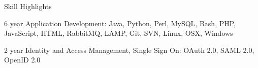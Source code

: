 \documentclass{resume} %
\begin{document}


\begin{rSection}{Skill Highlights}

\begin{rSubsection}{6 year Application Development: Java, Python, Perl, MySQL, Bash, PHP, JavaScript, HTML, RabbitMQ, LAMP, Git, SVN, Linux, OSX, Windows}{}{}

\end{rSubsection}

\begin{rSubsection}{2 year Identity and Access Management, Single Sign On: OAuth 2.0, SAML 2.0, OpenID 2.0}{}{}

\end{rSubsection}

\end{rSection}
\end{document}
